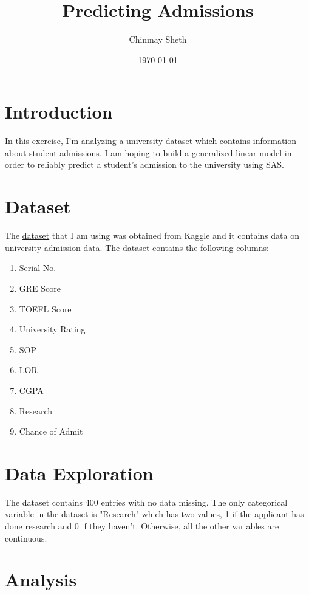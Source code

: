 \documentclass{article}
\title{Predicting Admissions}
\author{Chinmay Sheth}
\date\today
\begin{document}
\maketitle

\section*{Introduction}

In this exercise, I'm analyzing a university dataset which contains information about student admissions. I am hoping to build a generalized linear model in order to reliably predict a student's admission to the university using SAS.

\section*{Dataset}

The \href{https://www.kaggle.com/mohansacharya/graduate-admissions}{dataset} that I am using was obtained from Kaggle and it contains data on university admission data. The dataset contains the following columns:

\begin{enumerate}

\item Serial No.
\item GRE Score
\item TOEFL Score
\item University Rating
\item SOP
\item LOR
\item CGPA
\item Research
\item Chance of Admit

\end{enumerate}

\section*{Data Exploration}

The dataset contains 400 entries with no data missing. The only categorical variable in the dataset is "Research" which has two values, 1 if the applicant has done research and 0 if they haven't. Otherwise, all the other variables are continuous.

\section*{Analysis}
\end{document}
